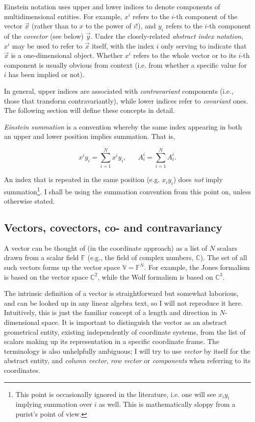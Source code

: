 \documentclass[]{aa}
\begin{document}
Einstein notation uses upper and lower indices to denote components of multidimensional entities. For example, $x^i$ refers to the $i$-th component  of the vector $\vec x$ (rather than to $x$ to the power of $i$!), and $y_i$ refers to the $i$-th component of the \emph{covector} (see below) $\vec y$. Under the closely-related \emph{abstract index notation}, $x^i$ may be used to refer to $\vec x$ itself, with the index $i$ only serving to indicate that $\vec x$ is a one-dimensional object. Whether $x^i$ refers to the whole vector or to its $i$-th component is usually obvious from context (i.e. from whether a specific value for $i$ has been implied or not).

In general, upper indices are associated with \emph{contravariant} components (i.e., those that transform contravariantly), while lower indices refer  to \emph{covariant} ones. The following section will define these concepts in detail.

{\em Einstein summation} is a convention whereby the same index appearing in both an upper and lower position implies summation. That is,

\[
  x^i y_i = \sum_{i=1}^{N} x^i y_i, \;\;\;\;\;\; A^i_i = \sum_{i=1}^{N} A^i_i.
\]

An index that is repeated in the same position (e.g. $x_iy_i$) does \emph{not} imply summation\footnote{This point is occasionally ignored in the literature, i.e. one will see $x_i y_i$ implying summation over $i$ as well. This is mathematically sloppy from a purist's point of view.}. I shall be using the summation convention from this point on, unless otherwise stated.


\subsection{Vectors, covectors, co- and contravariancy}
\label{sec:covectors}

A vector can be thought of (in the coordinate approach) as a list of $N$ scalars drawn from a scalar field $\mathbb{F}$ (e.g., the field of complex numbers, $\mathbb{C}$). The set of all such vectors forms up the vector space $\mathbb{V}=\mathbb{F}^N$. For example, the Jones formalism is based on the vector space $\mathbb{C}^2$, while the Wolf formalism is based on $\mathbb{C}^3$. 

The intrinsic definition of a vector is straightforward but somewhat laborious, and can be looked up in any linear algebra text, so I will not reproduce it here. Intuitively, this is just the familiar concept of a length and direction in $N$-dimensional space. It is important to distinguish the vector as an abstract geometrical entity, existing independently of coordinate systems, from the list of scalars making up its representation in a specific coordinate frame. The terminology is also unhelpfully ambiguous; I will try to use \emph{vector} by itself for the abstract entity, and \emph{column vector}, \emph{row vector} or \emph{components} when referring to its coordinates. 
\end{document}
